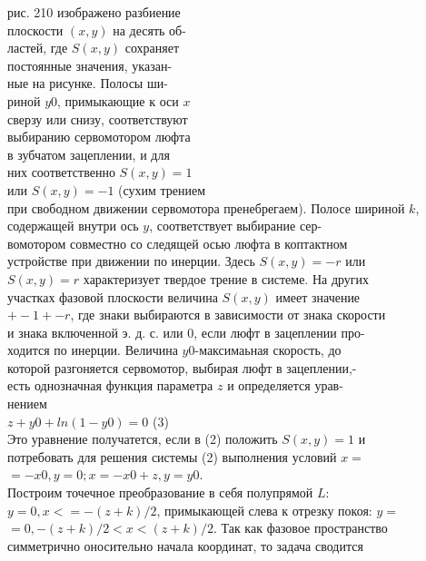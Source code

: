 \documentclass{article}
\begin{document}
рис. 210 изображено разбиение\\
плоскости $(x, y)$ на десять об-\\
ластей, где $S(x, y)$ сохраняет\\
постоянные значения, указан-\\
ные на рисунке. Полосы ши-\\
риной $y0$, примыкающие к оси $x$\\
сверзу или снизу, соответствуют\\
выбиранию сервомотором люфта\\
в зубчатом зацеплении, и для\\
них соответственно $S(x, y)=1$\\
или $S(x, y)=-1$ (сухим трением\\
при свободном движении сервомотора пренебрегаем). Полосе шириной $k$, содержащей внутри ось $y$, соответствует выбирание сер-\\
вомотором совместно со следящей осью люфта в коптактном\\
устройстве при движении по инерции. Здесь $S(x, y)=-r$ или\\
$S(x, y)=r$ характеризует твердое трение в системе. На других\\
участках фазовой плоскости величина $S(x, y)$ имеет значение\\
$+- 1 +- r$, где знаки выбираются в зависимости от знака скорости\\
и знака включенной э. д. с. или 0, если люфт в зацеплении про-\\
ходится по инерции. Величина $y0$-максимаьная скорость, до\\
которой разгоняется сервомотор, выбирая люфт в зацеплении,-\\
есть однозначная функция параметра $z$ и определяется урав-\\
нением\\
$z+y0+ln(1-y0)=0$ (3)\\
Это уравнение получатется, если в (2) положить $S(x,y)=1$ и\\
потребовать для решения системы (2) выполнения условий $x=$\\
$=-x0, y=0; x=-x0+z, y=y0$.\\%
Построим точечное преобразование в себя полупрямой $L:$\\
$y=0, x<=-(z+k)/2$, примыкающей слева к отрезку покоя: $y=$\\
$=0, -(z+k)/2<x<(z+k)/2$. Так как фазовое пространство\\
симметрично оносительно начала координат, то задача сводится\\
\end{document}
